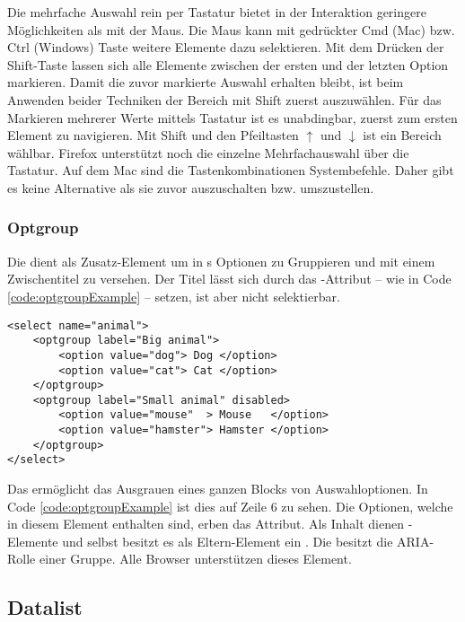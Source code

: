 Die mehrfache Auswahl rein per Tastatur bietet in der Interaktion geringere Möglichkeiten als mit der Maus. 
Die Maus kann mit gedrückter Cmd (Mac) bzw. Ctrl (Windows) Taste weitere Elemente dazu selektieren. 
Mit dem Drücken der Shift-Taste lassen sich alle Elemente zwischen der ersten und der letzten Option markieren. 
Damit die zuvor markierte Auswahl erhalten bleibt, ist beim Anwenden beider Techniken der Bereich mit Shift zuerst auszuwählen. 
Für das Markieren mehrerer Werte mittels Tastatur ist es unabdingbar, zuerst zum ersten Element zu navigieren. 
Mit Shift und den Pfeiltasten $\uparrow$ und $\downarrow$ ist ein Bereich wählbar. 
Firefox unterstützt noch die einzelne Mehrfachauswahl über die Tastatur. 
Auf dem Mac sind die Tastenkombinationen Systembefehle. 
Daher gibt es keine Alternative als sie zuvor auszuschalten bzw. umszustellen. 


\subsubsection{\color{dgray} Optgroup}
\label{sec:optgroup}

Die  dient als Zusatz-Element um in s Optionen zu Gruppieren und mit einem Zwischentitel zu versehen. 
Der Titel lässt sich durch das -Attribut – wie in Code \ref{code:optgroupExample} – setzen, ist aber nicht selektierbar. 

\begin{lstlisting}[style = htmlcssjs, caption = Optgroup Beispiel, label = code:optgroupExample]
<select name="animal">
    <optgroup label="Big animal">
        <option value="dog"> Dog </option>
        <option value="cat"> Cat </option>
    </optgroup>
    <optgroup label="Small animal" disabled>
        <option value="mouse"  > Mouse   </option>
        <option value="hamster"> Hamster </option>
    </optgroup>
</select>
\end{lstlisting}

Das  ermöglicht das Ausgrauen eines ganzen Blocks von Auswahloptionen. 
In Code \ref{code:optgroupExample} ist dies auf Zeile 6 zu sehen. 
Die Optionen, welche in diesem Element enthalten sind, erben das Attribut. 
Als Inhalt dienen -Elemente und selbst besitzt es als Eltern-Element ein . 
Die  besitzt die ARIA-Rolle einer Gruppe. 
Alle Browser unterstützen dieses Element. 


\subsection{Datalist}
\label{sec:datalist}

